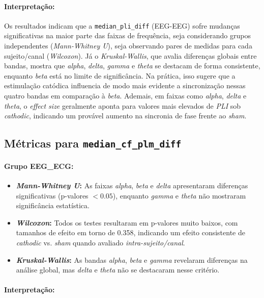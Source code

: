 \paragraph{Interpretação:}
Os resultados indicam que a \texttt{median\_pli\_diff} (EEG-EEG) sofre mudanças significativas na maior parte das faixas de frequência, seja considerando grupos independentes (\textit{Mann-Whitney U}), seja observando pares de medidas para cada sujeito/canal (\textit{Wilcoxon}). Já o \textit{Kruskal-Wallis}, que avalia diferenças globais entre bandas, mostra que \emph{alpha}, \emph{delta}, \emph{gamma} e \emph{theta} se destacam de forma consistente, enquanto \emph{beta} está no limite de significância. 
Na prática, isso sugere que a estimulação catódica influencia de modo mais evidente a sincronização nessas quatro bandas em comparação à \emph{beta}. Ademais, em faixas como \emph{alpha}, \emph{delta} e \emph{theta}, o \emph{effect size} geralmente aponta para valores mais elevados de \emph{PLI} sob \textit{cathodic}, indicando um provável aumento na sincronia de fase frente ao \textit{sham}.

\subsection{Métricas para \texttt{median\_cf\_plm\_diff}}
\paragraph{Grupo EEG\_ECG:}
\begin{itemize}
    \item \textbf{\textit{Mann-Whitney U}:} As faixas \emph{alpha}, \emph{beta} e \emph{delta} apresentaram diferenças significativas (p-valores $< 0.05$), enquanto \emph{gamma} e \emph{theta} não mostraram significância estatística.
    \item \textbf{\textit{Wilcoxon}:} Todos os testes resultaram em p-valores muito baixos, com tamanhos de efeito em torno de 0.358, indicando um efeito consistente de \textit{cathodic} vs. \textit{sham} quando avaliado \emph{intra-sujeito/canal}.
    \item \textbf{\textit{Kruskal-Wallis}:} As bandas \emph{alpha}, \emph{beta} e \emph{gamma} revelaram diferenças na análise global, mas \emph{delta} e \emph{theta} não se destacaram nesse critério.
\end{itemize}

\paragraph{Interpretação:}

